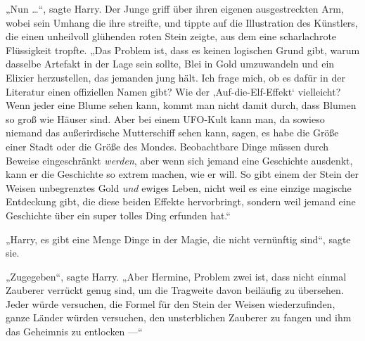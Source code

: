 „Nun …“, sagte Harry. Der Junge griff über ihren eigenen ausgestreckten Arm, wobei sein Umhang die ihre streifte, und tippte auf die Illustration des Künstlers, die einen unheilvoll glühenden roten Stein zeigte, aus dem eine scharlachrote Flüssigkeit tropfte.
„Das Problem ist, dass es keinen logischen Grund gibt, warum dasselbe Artefakt in der Lage sein sollte, Blei in Gold umzuwandeln und ein Elixier herzustellen, das jemanden jung hält. Ich frage mich, ob es dafür in der Literatur einen offiziellen Namen gibt? Wie der ‚Auf-die-Elf-Effekt‘ vielleicht? Wenn jeder eine Blume sehen kann, kommt man nicht damit durch, dass Blumen so groß wie Häuser sind. Aber bei einem UFO-Kult kann man, da sowieso niemand das außerirdische Mutterschiff sehen kann, sagen, es habe die Größe einer Stadt oder die Größe des Mondes. Beobachtbare Dinge müssen durch Beweise eingeschränkt \emph{werden}, aber wenn sich jemand eine Geschichte ausdenkt, kann er die Geschichte so extrem machen, wie er will. So gibt einem der Stein der Weisen unbegrenztes Gold \emph{und} ewiges Leben, nicht weil es eine einzige magische Entdeckung gibt, die diese beiden Effekte hervorbringt, sondern weil jemand eine Geschichte über ein super tolles Ding erfunden hat.“

„Harry, es gibt eine Menge Dinge in der Magie, die nicht vernünftig sind“, sagte sie.

„Zugegeben“, sagte Harry.
„Aber Hermine, Problem zwei ist, dass nicht einmal Zauberer verrückt genug sind, um die Tragweite davon beiläufig zu übersehen. Jeder würde versuchen, die Formel für den Stein der Weisen wiederzufinden, ganze Länder würden versuchen, den unsterblichen Zauberer zu fangen und ihm das Geheimnis zu entlocken —“

